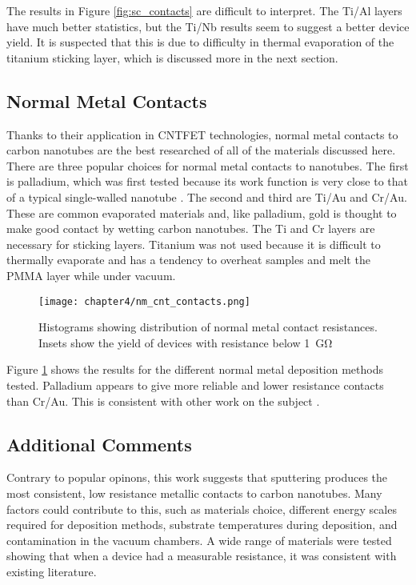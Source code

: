 The results in Figure \ref{fig:sc_contacts} are difficult to interpret. The Ti/Al layers have much better statistics, but the Ti/Nb results seem to suggest a better device yield. It is suspected that this is due to difficulty in thermal evaporation of the titanium sticking layer, which is discussed more in the next section.

\subsection{Normal Metal Contacts}
\label{sec:nm_contacts}

Thanks to their application in CNTFET technologies, normal metal contacts to carbon nanotubes are the best researched of all of the materials discussed here. There are three popular choices for normal metal contacts to nanotubes. The first is palladium, which was first tested because its work function is very close to that of a typical single-walled  nanotube \cite{Javey2003, Jejurikar2010}. The second and third are Ti/Au and Cr/Au. These are common evaporated materials and, like palladium, gold is thought to make good contact by wetting carbon nanotubes. The Ti and Cr layers are necessary for sticking layers. Titanium was not used because it is difficult to thermally evaporate and has a tendency to overheat samples and melt the PMMA layer while under vacuum.

\begin{figure}
    \centering
    \texttt{[image: chapter4/nm\_cnt\_contacts.png]}
    \caption{Histograms showing distribution of normal metal contact resistances. Insets show the yield of devices with resistance below \SI{1}{\giga\ohm}}
    \label{fig:nm_contacts}
\end{figure}

Figure \ref{fig:nm_contacts} shows the results for the different normal metal deposition methods tested. Palladium appears to give more reliable and lower resistance contacts than Cr/Au. This is consistent with other work on the subject \cite{Javey2003}.

\subsection{Additional Comments}

Contrary to popular opinons, this work suggests that sputtering produces the most consistent, low resistance metallic contacts to carbon nanotubes. Many factors could contribute to this, such as materials choice, different energy scales required for deposition methods, substrate temperatures during deposition, and contamination in the vacuum chambers. A wide range of materials were tested showing that when a device had a measurable resistance, it was consistent with existing literature. 

